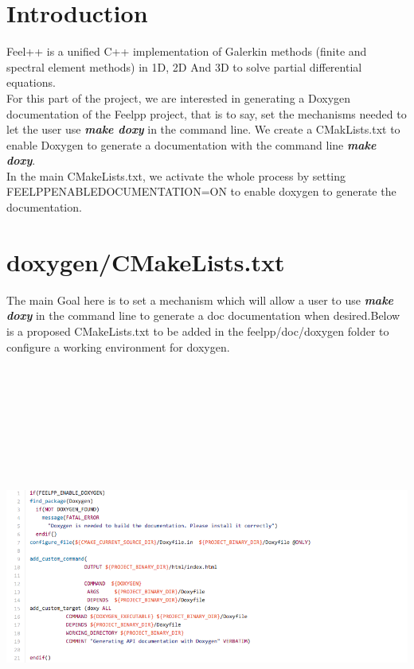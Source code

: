 \documentclass[11pt,utf8]{article}
\begin{document}
\section{Introduction}
Feel++ is a unified C++ implementation of Galerkin methods (finite and spectral element methods) in 1D, 2D And 3D to solve partial differential equations.\\
For this part of the project, we are interested in generating a Doxygen documentation of the Feelpp project, that is to say, set the mechanisms needed to let the user use  \textbf{\textit{make doxy}} in the command line.
We create a CMakLists.txt to enable Doxygen to generate a documentation with the  command line  \textbf{\textit{make doxy}}.\\
In the main CMakeLists.txt, we activate the whole process by setting \\
 FEELPP\textunderscore ENABLE\textunderscore DOCUMENTATION=ON to enable doxygen to generate the documentation.



\section{doxygen/CMakeLists.txt}
The main Goal here is to set a mechanism which will allow a user to use \textbf{\textit{make doxy}} in the command line to generate a doc documentation when desired.Below is a proposed CMakeLists.txt to be added in the feelpp/doc/doxygen folder to configure a working environment for doxygen.


 \begin{center}
 \includegraphics[width=20cm,height=14cm]{im1}
 \end{center}
 
\end{document}
